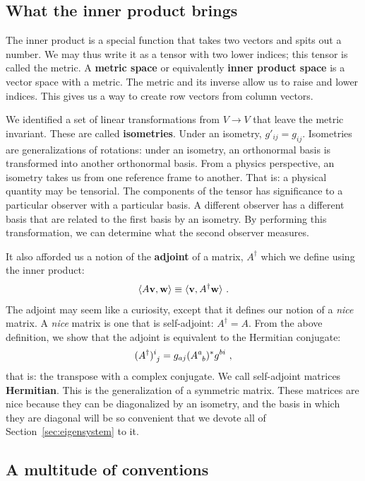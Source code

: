 \documentclass[12pt]{article}
\begin{document}
\subsection{What the inner product brings}

The inner product is a special function that takes two vectors and spits out a number. We may thus write it as a tensor with two lower indices; this tensor is called the metric. A \textbf{metric space} or equivalently \textbf{inner product space} is a vector space with a metric. The metric and its inverse allow us to raise and lower indices. This gives us a way to create row vectors from column vectors. 

We identified a set of linear transformations from $V\to V$ that leave the metric invariant. These are called \textbf{isometries}. Under an isometry, $g'_{ij} = g_{ij}$. Isometries are generalizations of rotations: under an isometry, an orthonormal basis is transformed into another orthonormal basis. From a physics perspective, an isometry takes us from one reference frame to another. That is: a physical quantity may be tensorial. The components of the tensor has significance to a particular observer with a particular basis. A different observer has a different basis that are related to the first basis by an isometry. By performing this transformation, we can determine what the second observer measures.

It also afforded us a notion of the \textbf{adjoint} of a matrix, $A^\dag$ which we define using the inner product:
\begin{align}
    \langle A \mathbf{v}, \mathbf{w} \rangle 
    \equiv
    \langle \mathbf{v}, A^\dag\mathbf{w} \rangle  \ .
\end{align}
The adjoint may seem like a curiosity, except that it defines our notion of a \emph{nice} matrix. A \emph{nice} matrix is one that is self-adjoint: $A^\dag = A$. From the above definition, we show that the adjoint is equivalent to the Hermitian conjugate: 
\begin{align}
    (A^\dag)\aij{i}{j} = g_{aj}(A\aij{a}{b})^*g^{bi} \ ,
\end{align}
that is: the transpose with a complex conjugate. We call self-adjoint matrices \textbf{Hermitian}. This is the generalization of a symmetric matrix. These matrices are nice because they can be diagonalized by an isometry, and the basis in which they are diagonal will be so convenient that we devote all of Section~\ref{sec:eigensystem} to it.



\subsection{A multitude of conventions}
\end{document}

